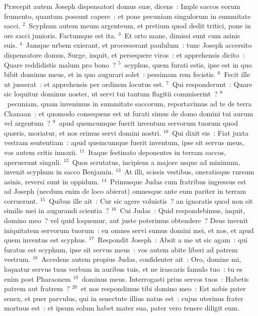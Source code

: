 \lettrine[lines=3,image=true,loversize=0.05,lraise=-0.03]{P}{}r\ae cepit autem Joseph dispensatori domus su\ae , dicens~: Imple saccos eorum frumento, quantum possunt capere~: et pone pecuniam singulorum in summitate sacci.
${}^{2}$~Scyphum autem meum argenteum, et pretium quod dedit tritici, pone in ore sacci junioris. Factumque est ita.
${}^{3}$~Et orto mane, dimissi sunt cum asinis suis.
${}^{4}$~Jamque urbem exierant, et processerant paululum~: tunc Joseph accersito dispensatore domus, Surge, inquit, et persequere viros~: et apprehensis dicito~: Quare reddidistis malum pro bono~?
${}^{5}$~scyphus, quem furati estis, ipse est in quo bibit dominus meus, et in quo augurari solet~: pessimam rem fecistis.
${}^{6}$~Fecit ille ut jusserat~: et apprehensis per ordinem locutus est.
${}^{7}$~Qui responderunt~: Quare sic loquitur dominus noster, ut servi tui tantum flagitii commiserint~?
${}^{8}$~pecuniam, quam invenimus in summitate saccorum, reportavimus ad te de terra Chanaan~: et quomodo consequens est ut furati simus de domo domini tui aurum vel argentum~?
${}^{9}$~apud quemcumque fuerit inventum servorum tuorum quod qu\ae ris, moriatur, et nos erimus servi domini nostri.
${}^{10}$~Qui dixit eis~: Fiat juxta vestram sententiam~: apud quemcumque fuerit inventum, ipse sit servus meus, vos autem eritis innoxii.
${}^{11}$~Itaque festinato deponentes in terram saccos, aperuerunt singuli.
${}^{12}$~Quos scrutatus, incipiens a majore usque ad minimum, invenit scyphum in sacco Benjamin.
${}^{13}$~At illi, scissis vestibus, oneratisque rursum asinis, reversi sunt in oppidum.
${}^{14}$~Primusque Judas cum fratribus ingressus est ad Joseph (necdum enim de loco abierat) omnesque ante eum pariter in terram corruerunt.
${}^{15}$~Quibus ille ait~: Cur sic agere voluistis~? an ignoratis quod non sit similis mei in augurandi scientia~?
${}^{16}$~Cui Judas~: Quid respondebimus, inquit, domino meo~? vel quid loquemur, aut juste poterimus obtendere~? Deus invenit iniquitatem servorum tuorum~: en omnes servi sumus domini mei, et nos, et apud quem inventus est scyphus.
${}^{17}$~Respondit Joseph~: Absit a me ut sic agam~: qui furatus est scyphum, ipse sit servus meus~: vos autem abite liberi ad patrem vestrum.
${}^{18}$~Accedens autem propius Judas, confidenter ait~: Oro, domine mi, loquatur servus tuus verbum in auribus tuis, et ne irascaris famulo tuo~: tu es enim post Pharaonem
${}^{19}$~dominus meus. Interrogasti prius servos tuos~: Habetis patrem aut fratrem~?
${}^{20}$~et nos respondimus tibi domino meo~: Est nobis pater senex, et puer parvulus, qui in senectute illius natus est~: cujus uterinus frater mortuus est~: et ipsum solum habet mater sua, pater vero tenere diligit eum.
